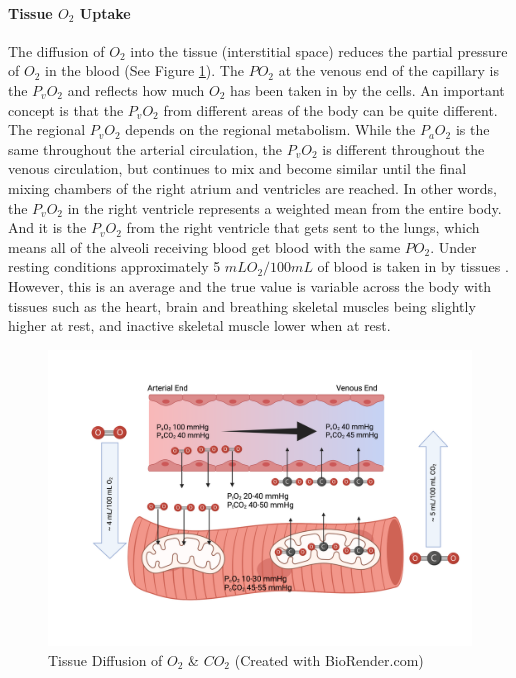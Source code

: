 \paragraph{Tissue $O_2$ Uptake}

The diffusion of $O_2$ into the tissue (interstitial space) reduces the partial pressure of $O_2$ in the blood (See Figure \ref{fig:tissue_diffusion}). The $PO_2$ at the venous end of the capillary is the $P_vO_2$ and reflects how much $O_2$ has been taken in by the cells. An important concept is that the $P_vO_2$ from different areas of the body can be quite different. The regional $P_vO_2$ depends on the regional metabolism. While the $P_aO_2$ is the same throughout the arterial circulation, the $P_vO_2$ is different throughout the venous circulation, but continues to mix and become similar until the final mixing chambers of the right atrium and ventricles are reached. In other words, the $P_vO_2$ in the right ventricle represents a weighted mean from the entire body. And it is the $P_vO_2$ from the right ventricle that gets sent to the lungs, which means all of the alveoli receiving blood get blood with the same $PO_2$. Under resting conditions approximately 5 $mL O_2 / 100 mL$ of blood is taken in by tissues \cite{hall_guyton_2020}. However, this is an average and the true value is variable across the body with tissues such as the heart, brain and breathing skeletal muscles being slightly higher at rest, and inactive skeletal muscle lower when at rest.

\begin{figure}[!h]
    \centering
    \includegraphics[width=0.75\linewidth]{./figure/tissue_diffusion.png}
    \caption{Tissue Diffusion of $O_2$ \& $CO_2$ \footnotesize{(Created with BioRender.com)}}
    \label{fig:tissue_diffusion}
\end{figure}

